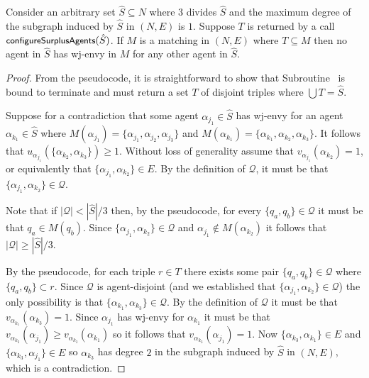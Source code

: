 \begin{lem}
\label{lem:threed_efr_as_max_degree_2_subgraph_configureSurplusAgents}
Consider an arbitrary set $\hat{S}\subseteq N$ where $3$ divides $\hat{S}$ and the maximum degree of the subgraph induced by $\hat{S}$ in $(N, E)$ is $1$. Suppose $T$ is returned by a call $\algorithmfont{configureSurplusAgents}(\hat{S})$. If $M$ is a matching in $(N, E)$ where $T \subseteq M$ then no agent in $\hat{S}$ has wj-envy in $M$ for any other agent in $\hat{S}$.
\end{lem}
\begin{proof}
From the pseudocode, it is straightforward to show that Subroutine~ is bound to terminate and must return a set $T$ of disjoint triples where $\bigcup T = \hat{S}$.

Suppose for a contradiction that some agent $\alpha_{j_1} \in \hat{S}$ has wj-envy for an agent $\alpha_{k_1} \in \hat{S}$ where $M(\alpha_{j_1}) = \{ \alpha_{j_1}, \alpha_{j_2}, \alpha_{j_3} \}$ and $M(\alpha_{k_1}) = \{ \alpha_{k_1}, \alpha_{k_2}, \alpha_{k_3} \}$. It follows that $u_{\alpha_{j_1}}(\{  \alpha_{k_2}, \alpha_{k_3} \}) \geq 1$. Without loss of generality assume that $v_{\alpha_{j_1}}(\alpha_{k_2})=1$, or equivalently that $\{ \alpha_{j_1}, \alpha_{k_2} \} \in E$. By the definition of $\mathcal{Q}$, it must be that $\{ \alpha_{j_1}, \alpha_{k_2} \} \in \mathcal{Q}$.

Note that if $|\mathcal{Q}| < |\hat{S}|/3$ then, by the pseudocode, for every $\{ q_a, q_b \} \in \mathcal{Q}$ it must be that $q_a \in M(q_b)$. Since $\{ \alpha_{j_1}, \alpha_{k_2} \} \in \mathcal{Q}$ and $\alpha_{j_1} \notin M(\alpha_{k_2})$ it follows that $|\mathcal{Q}| \geq |\hat{S}|/3$. 

By the pseudocode, for each triple $r \in T$ there exists some pair $\{ q_a, q_b \} \in \mathcal{Q}$ where $\{ q_a, q_b \} \subset r$. Since $\mathcal{Q}$ is agent-disjoint (and we established that $\{ \alpha_{j_1}, \alpha_{k_2} \} \in \mathcal{Q}$) the only possibility is that $\{ \alpha_{k_1}, \alpha_{k_3} \} \in \mathcal{Q}$. By the definition of $\mathcal{Q}$ it must be that $v_{\alpha_{k_1}}(\alpha_{k_3})=1$. Since $\alpha_{j_1}$ has wj-envy for $\alpha_{k_1}$ it must be that $v_{\alpha_{k_3}}(\alpha_{j_1}) \geq v_{\alpha_{k_3}}(\alpha_{k_1})$ so it follows that $v_{\alpha_{k_3}}(\alpha_{j_1}) = 1$. Now $\{ \alpha_{k_3}, \alpha_{k_1} \} \in E$ and $\{ \alpha_{k_3}, \alpha_{j_1} \} \in E$ so $\alpha_{k_3}$ has degree $2$ in the subgraph induced by $\hat{S}$ in $(N, E)$, which is a contradiction.
\end{proof}

